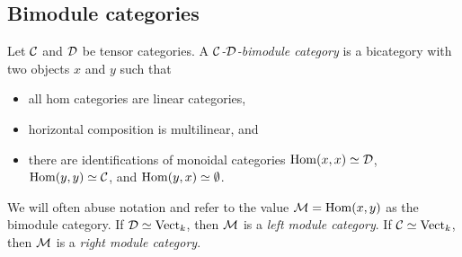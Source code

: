\documentclass{amsart}
\begin{document}
%
%



\subsection{Bimodule categories}

\begin{definition}
	Let $\mathcal C$ and $\mathcal D$ be tensor categories. A {\em $\mathcal C$-$\mathcal D$-bimodule category} is a bicategory with two objects $x$ and $y$ such that
	\begin{itemize}
		\item all hom categories are linear categories, 
		\item horizontal composition is multilinear, and
		\item there are identifications of monoidal categories $\operatorname{Hom}(x,x) \simeq \mathcal D$, $\operatorname{Hom}(y,y) \simeq \mathcal C$, and $\operatorname{Hom}(y,x) \simeq \emptyset$.
	\end{itemize}
	We will often abuse notation and refer to the value $\mathcal M = \operatorname{Hom}(x,y)$ as the bimodule category. If $\mathcal D \simeq \mathrm{Vect}_k$, then $\mathcal M$ is a {\em left module category}. If $\mathcal C \simeq \mathrm{Vect}_k$, then $\mathcal M$ is a {\em right module category}.
\end{definition}
	
\end{document}
